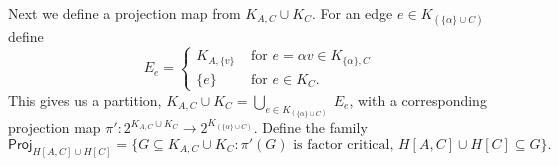 \documentclass[10pt]{amsart}
\theoremstyle{definition}
\begin{document}
	Next we define a projection map from $K_{A,C} \cup K_C$.
	For an edge $e \in K_{(\{\alpha\} \cup C)}$ define
	\[E_e = 
	\begin{cases}
	K_{A, \{v\}} & \text{ for } e  = \alpha v\in K_{\{ \alpha \},C} \\
	\{e\} & \text{ for } e \in K_{C}. 
	\end{cases}\]
	This gives us a partition, 
	$K_{A,C} \cup K_C = \textstyle{\bigcup}_{e\in K_{(\{ \alpha \}\cup C)}} \: E_e$,
	with a corresponding projection map $\pi' : 2^{K_{A,C} \cup K_C} \to 2^{K_{(\{ \alpha \} \cup C)}}$.
	Define the family
	\[\mathsf{Proj}_{H[A,C]\cup H[C]} = 
	\{
	G\subseteq K_{A,C}\cup K_C : \pi'(G) \text{ is factor critical, } H[A,C]\cup H[C]\subseteq G\}.
	\]
	
\end{document}
